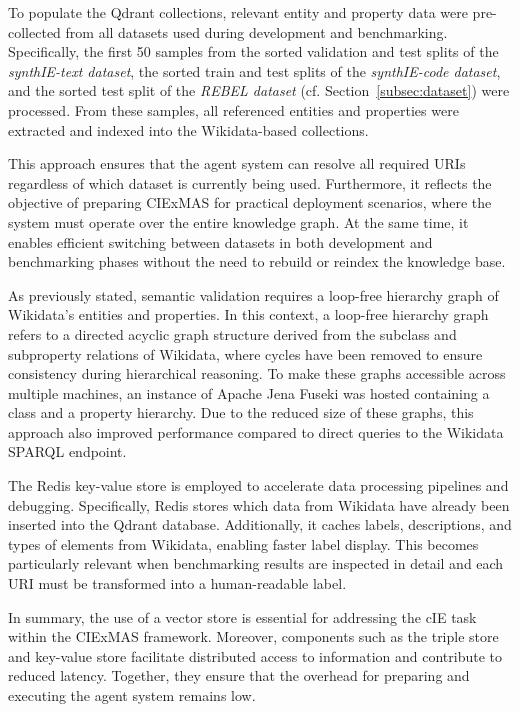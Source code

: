 \documentclass[a4paper,oneside,bibliography=totoc]{scrbook}
\begin{document}
To populate the Qdrant collections, relevant entity and property data were pre-collected from all datasets used during development and benchmarking. Specifically, the first 50 samples from the sorted validation and test splits of the \textit{synthIE-text dataset}, the sorted train and test splits of the \textit{synthIE-code dataset}, and the sorted test split of the \textit{REBEL dataset} (cf. Section~\ref{subsec:dataset}) were processed. From these samples, all referenced entities and properties were extracted and indexed into the Wikidata-based collections.

This approach ensures that the agent system can resolve all required URIs regardless of which dataset is currently being used. Furthermore, it reflects the objective of preparing CIExMAS for practical deployment scenarios, where the system must operate over the entire knowledge graph. At the same time, it enables efficient switching between datasets in both development and benchmarking phases without the need to rebuild or reindex the knowledge base.

As previously stated, semantic validation requires a loop-free hierarchy graph of Wikidata’s entities and properties. In this context, a loop-free hierarchy graph refers to a directed acyclic graph structure derived from the subclass and subproperty relations of Wikidata, where cycles have been removed to ensure consistency during hierarchical reasoning. To make these graphs accessible across multiple machines, an instance of Apache Jena Fuseki was hosted containing a class and a property hierarchy. Due to the reduced size of these graphs, this approach also improved performance compared to direct queries to the Wikidata \ac{SPARQL} endpoint.

The Redis key-value store is employed to accelerate data processing pipelines and debugging. Specifically, Redis stores which data from Wikidata have already been inserted into the Qdrant database. Additionally, it caches labels, descriptions, and types of elements from Wikidata, enabling faster label display. This becomes particularly relevant when benchmarking results are inspected in detail and each URI must be transformed into a human-readable label.

In summary, the use of a vector store is essential for addressing the \ac{cIE} task within the CIExMAS framework. Moreover, components such as the triple store and key-value store facilitate distributed access to information and contribute to reduced latency. Together, they ensure that the overhead for preparing and executing the agent system remains low.
\end{document}
